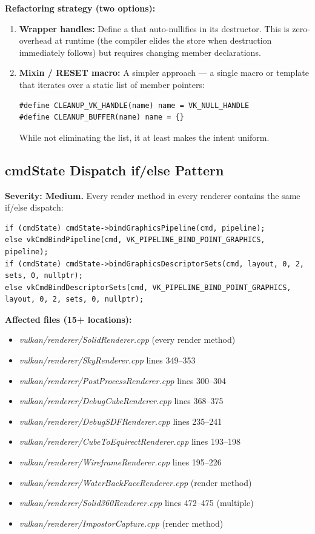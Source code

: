 \documentclass[11pt,a4paper]{article}
\newcommand{\code}[1]{\texttt{\detokenize{#1}}}
\newcommand{\file}[1]{\textsl{#1}}
\begin{document}
\textbf{Refactoring strategy (two options):}
\begin{enumerate}
    \item \textbf{Wrapper handles:} Define a \code{TrackedHandle<T>} that auto-nullifies in its destructor. This is zero-overhead at runtime (the compiler elides the store when destruction immediately follows) but requires changing member declarations.
    \item \textbf{Mixin / RESET macro:} A simpler approach --- a single \code{clearMembers()} macro or template that iterates over a static list of member pointers:
    \begin{lstlisting}
#define CLEANUP_VK_HANDLE(name) name = VK_NULL_HANDLE
#define CLEANUP_BUFFER(name) name = {}
    \end{lstlisting}
    While not eliminating the list, it at least makes the intent uniform.
\end{enumerate}

\subsection{cmdState Dispatch if/else Pattern}
\label{sec:cmdstate}

\textbf{Severity: Medium.} Every render method in every renderer contains the same if/else dispatch:
\begin{lstlisting}
if (cmdState) cmdState->bindGraphicsPipeline(cmd, pipeline);
else vkCmdBindPipeline(cmd, VK_PIPELINE_BIND_POINT_GRAPHICS, pipeline);
if (cmdState) cmdState->bindGraphicsDescriptorSets(cmd, layout, 0, 2, sets, 0, nullptr);
else vkCmdBindDescriptorSets(cmd, VK_PIPELINE_BIND_POINT_GRAPHICS, layout, 0, 2, sets, 0, nullptr);
\end{lstlisting}

\textbf{Affected files (15+ locations):}
\begin{itemize}
    \item \file{vulkan/renderer/SolidRenderer.cpp} (every render method)
    \item \file{vulkan/renderer/SkyRenderer.cpp} lines 349--353
    \item \file{vulkan/renderer/PostProcessRenderer.cpp} lines 300--304
    \item \file{vulkan/renderer/DebugCubeRenderer.cpp} lines 368--375
    \item \file{vulkan/renderer/DebugSDFRenderer.cpp} lines 235--241
    \item \file{vulkan/renderer/CubeToEquirectRenderer.cpp} lines 193--198
    \item \file{vulkan/renderer/WireframeRenderer.cpp} lines 195--226
    \item \file{vulkan/renderer/WaterBackFaceRenderer.cpp} (render method)
    \item \file{vulkan/renderer/Solid360Renderer.cpp} lines 472--475 (multiple)
    \item \file{vulkan/renderer/ImpostorCapture.cpp} (render method)
\end{itemize}
\end{document}
